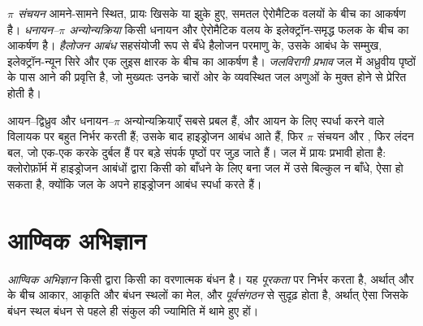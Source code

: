 \begin{definition}[असहसंयोजी अन्योन्यक्रियाएँ]\label{def:b3:supramolecular:interactions}
\emph{$\pi$ संचयन} आमने-सामने स्थित, प्रायः
खिसके या झुके हुए, समतल ऐरोमैटिक वलयों के बीच का आकर्षण है। \emph{धनायन--$\pi$
अन्योन्यक्रिया} किसी धनायन और
ऐरोमैटिक वलय के इलेक्ट्रॉन-समृद्ध फलक के बीच का आकर्षण है। \emph{हैलोजन आबंध}
सहसंयोजी रूप से बँधे हैलोजन परमाणु के, उसके आबंध के सम्मुख, इलेक्ट्रॉन-न्यून सिरे और
एक लुइस क्षारक के बीच का आकर्षण है। \emph{जलविरागी
प्रभाव} जल में अध्रुवीय पृष्ठों के पास आने की
प्रवृत्ति है, जो मुख्यतः उनके चारों ओर के व्यवस्थित जल अणुओं के मुक्त होने से
प्रेरित होती है।
\end{definition}

आयन--द्विध्रुव और धनायन--$\pi$ अन्योन्यक्रियाएँ सबसे प्रबल हैं, और
आयन के लिए स्पर्धा करने वाले विलायक पर बहुत निर्भर करती हैं; उसके बाद हाइड्रोजन आबंध आते हैं,
फिर $\pi$ संचयन और , फिर लंदन बल, जो एक-एक करके दुर्बल हैं पर
बड़े संपर्क पृष्ठों पर जुड़ जाते हैं। जल में  प्रायः
प्रभावी होता है: क्लोरोफ़ॉर्म में हाइड्रोजन आबंधों द्वारा किसी  को बाँधने के लिए बना 
जल में उसे बिल्कुल न बाँधे, ऐसा हो सकता है, क्योंकि जल के अपने हाइड्रोजन आबंध स्पर्धा करते हैं।

\section{आण्विक अभिज्ञान}

\begin{definition}[आण्विक अभिज्ञान]\label{def:b3:supramolecular:recognition}
\emph{आण्विक अभिज्ञान} किसी  द्वारा किसी  का वरणात्मक
बंधन है। यह \emph{पूरकता} पर निर्भर करता है,
अर्थात्  और  के बीच आकार, आकृति और बंधन स्थलों का मेल, और
\emph{पूर्वसंगठन} से सुदृढ़ होता है, अर्थात् ऐसा  जिसके
बंधन स्थल बंधन से पहले ही संकुल की ज्यामिति में थामे हुए हों।
\end{definition}

